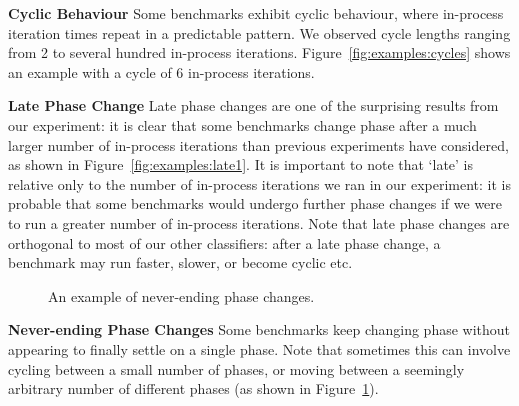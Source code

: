 \documentclass[a4paper,UKenglish]{lipics}
\begin{document}
\textbf{Cyclic Behaviour} \label{sub:cyclic}
Some benchmarks exhibit cyclic behaviour, where in-process iteration times
repeat in a predictable pattern. We observed cycle lengths ranging from
2 to several hundred in-process iterations. Figure~\ref{fig:examples:cycles} shows
an example with a cycle of 6 in-process iterations.


\textbf{Late Phase Change} \label{sub:phase}
Late phase changes are one of the surprising results from our experiment: it is
clear that some benchmarks change phase after a much larger number of in-process iterations
than previous experiments have considered, as shown in Figure~\ref{fig:examples:late1}.
It is important to note that `late' is relative only to the number of in-process
iterations we ran in our experiment: it is probable that some benchmarks would
undergo further phase changes if we were to run a greater number of in-process
iterations. Note that late phase changes are orthogonal to most of our other
classifiers: after a late phase change, a benchmark may run faster, slower, or
become cyclic etc.


\begin{figure}[t]
\caption{An example of never-ending phase changes.}
\label{fig:examples:neverending}
\end{figure}

\textbf{Never-ending Phase Changes} \label{sub:long}
Some benchmarks keep changing phase without appearing to finally settle on a
single phase. Note that sometimes this can involve cycling between a small
number of phases, or moving between a seemingly arbitrary number of different
phases (as shown in Figure~\ref{fig:examples:neverending}).
\end{document}
